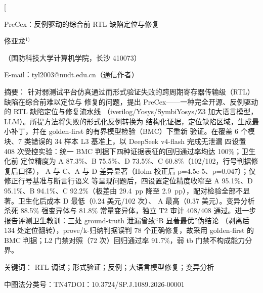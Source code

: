 \documentclass[twocolumn,10pt]{ctexart}
\let\songti\songfamily
\let\heiti\heifamily
\let\fangsong\fangfamily
\begin{document}
\pagestyle{plain}

\twocolumn[%
\begin{center}
  {\heiti{} PreCex：反例驱动的综合前 RTL 缺陷定位与修复}\par
  \vspace{6pt}
  {\fangsong{} 佟亚龙$^{1)}$}\par
  \vspace{4pt}
  {\songti\fontsize{8}{12}\selectfont（国防科技大学计算机学院，长沙 410073）}\par
  \vspace{2pt}
  {\songti\fontsize{8}{12}\selectfont E-mail：tyl2003@nudt.edu.cn（通信作者）}\par
  \vspace{8pt}
\end{center}
\begin{flushleft}
  {\heiti\fontsize{8.5}{13}\selectfont 摘\quad 要：}{\songti\fontsize{8.5}{13}\selectfont
  针对弱测试平台仿真通过而形式验证失败的跨周期寄存器传输级（RTL）缺陷在综合前难以定位与
  修复的问题，提出 PreCex——一种完全开源、反例驱动的 RTL 缺陷定位与修复流水线
  （iverilog/Yosys/SymbiYosys/Z3 加大语言模型，LLM）。所提方法将失败的形式化反例转换为
  结构化证据，定位缺陷区域，生成最小补丁，并在 golden-first 的有界模型检验（BMC）下重新
  验证。在覆盖 6 个模块、7 类错误的 34 样本 L3 基准上，以 DeepSeek v4-flash 完成无泄漏
  四设置 408 次受控实验：统一 BMC 判据下四种证据表征的回归通过率均达 100\%；卫生化前
  定位精度为 A 87.3\%、B 75.5\%、D 73.5\%、C 60.8\%（102/102，行号判据修复后口径），
  A 与 C、A 与 D 差异显著（Holm 校正后 p=4.5e-5、p=0.047）；仅修正行号基准与断言行语义
  等呈现问题后，四设置定位精度收窄至 A 95.1\%、D 95.1\%、B 94.1\%、C 92.2\%（极差由
  29.4~pp 降至 2.9~pp），配对检验全部不显著。卫生化后成本 D 最低（0.24 美元/102 次）、
  A 最高（0.37 美元）。变异分析杀死 88.5\% 强变异体与 81.8\% 常量变异体，独立 T2 审计
  408/408 通过。进一步报告评测卫生教训：三处 ground-truth 泄漏曾致“B 显著最优”伪结论
  （剥离后 134 处定位翻转），prove/k-归纳判据误判 78 个正确修复，故采用 golden-first 的
  BMC 判据；L2 门禁对照（72 次）回归通过率 91.7\%，弱 tb 门禁不构成能力分界。}\par
  \vspace{4pt}
  {\heiti\fontsize{8.5}{13}\selectfont 关键词：}{\songti\fontsize{8.5}{13}\selectfont
  RTL 调试；形式验证；反例；大语言模型修复；变异分析}\par
  \vspace{2pt}
  {\songti\fontsize{8.5}{13}\selectfont 中图法分类号：TN47\qquad DOI：10.3724/SP.J.1089.2026-00001}\par
  \vspace{6pt}
\end{flushleft}
\end{document}
